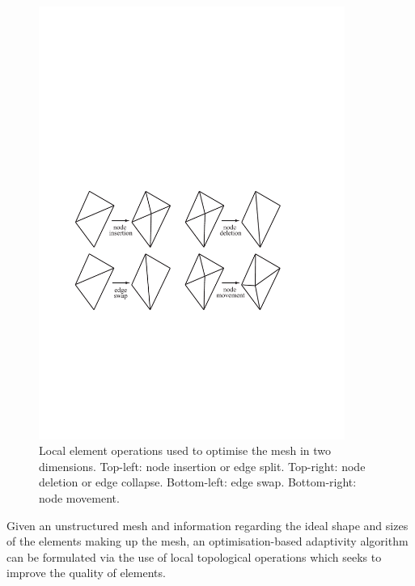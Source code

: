 \begin{figure}
\centering
\includegraphics[width=10.0cm]{images/MeshOperations2D.pdf}
\caption{Local element operations used to optimise the mesh in two
  dimensions. Top-left: node insertion or edge split.  Top-right: node
  deletion or edge collapse. Bottom-left: edge swap. Bottom-right:
  node movement.}
\label{Fig:MeshOperations}
\end{figure}

Given an unstructured mesh and information regarding the ideal shape
and sizes of the elements making up the mesh, an optimisation-based
adaptivity algorithm can be formulated via the use of local
topological operations which seeks to improve the quality of elements.

